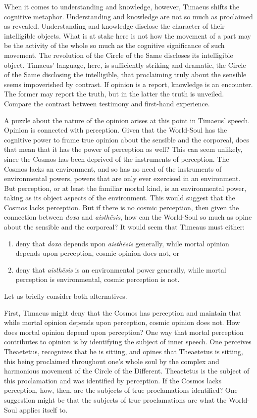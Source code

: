 When it comes to understanding and knowledge, however, Timaeus shifts the cognitive metaphor. Understanding and knowledge are not so much as proclaimed as revealed. Understanding and knowledge disclose the character of their intelligible objects. What is at stake here is not how the movement of a part may be the activity of the whole so much as the cognitive significance of such movement. The revolution of the Circle of the Same discloses its intelligible object. Timaeus' language, here, is sufficiently striking and dramatic, the Circle of the Same disclosing the intelligible, that proclaiming truly about the sensible seems impoverished by contrast. If opinion is a report, knowledge is an encounter. The former may report the truth, but in the latter the truth is unveiled. Compare the contrast between testimony and first-hand experience. 

A puzzle about the nature of the opinion arises at this point in Timaeus' speech. Opinion is connected with perception. Given that the World-Soul has the cognitive power to frame true opinion about the sensible and the corporeal, does that mean that it has the power of perception as well? This can seem unlikely, since the Cosmos has been deprived of the instruments of perception. The Cosmos lacks an environment, and so has no need of the instruments of environmental powers, powers that are only ever exercised in an environment. But perception, or at least the familiar mortal kind, is an environmental power, taking as its object aspects of the environment. This would suggest that the Cosmos lacks perception. But if there is no cosmic perception, then given the connection between \emph{doxa} and \emph{aisthēsis}, how can the World-Soul so much as opine about the sensible and the corporeal? It would seem that Timeaus must either:
\begin{enumerate}[(1)]
	\item deny that \emph{doxa} depends upon \emph{aisthēsis} generally, while mortal opinion depends upon perception, cosmic opinion does not, or
	\item deny that \emph{aisthēsis} is an environmental power generally, while mortal perception is environmental, cosmic perception is not. 
\end{enumerate}

Let us briefly consider both alternatives.

First, Timaeus might deny that the Cosmos has perception and maintain that while mortal opinion depends upon perception, cosmic opinion does not. How does mortal opinion depend upon perception? One way that mortal perception contributes to opinion is by identifying the subject of inner speech. One perceives Theaetetus, recognizes that he is sitting, and opines that Theaetetus is sitting, this being proclaimed throughout one's whole soul by the complex and harmonious movement of the Circle of the Different. Theaetetus is the subject of this proclamation and was identified by perception. If the Cosmos lacks perception, how, then, are the subjects of true proclamations identified? One suggestion might be that the subjects of true proclamations are what the World-Soul applies itself to. 

